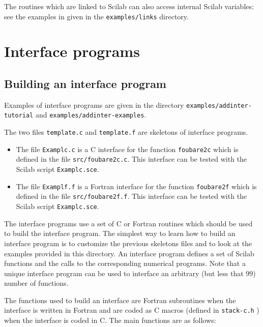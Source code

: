 The routines which are linked to Scilab can also access internal 
Scilab variables: see the examples in given in the {\tt examples/links}
directory.

\section{Interface programs}

\subsection{Building an interface program}
Examples of interface programs are given in the directory 
{\tt examples/addinter-tutorial} and {\tt examples/addinter-examples}. 

\noindent
The two files {\tt template.c} and {\tt template.f} are skeletons of 
interface programs.
\begin{itemize}
\item The file {\tt Examplc.c} is a C interface for the function {\tt foubare2c} 
which is defined in the file {\tt src/foubare2c.c}. This interface can
be tested with the Scilab script {\tt Examplc.sce}.
\item The file {\tt Examplf.f} is a Fortran interface for the function
{\tt foubare2f} which is defined in the file {\tt src/foubare2f.f}. 
This interface can be tested with the Scilab script {\tt Examplc.sce}.
\end{itemize}
The interface programs use a set of C or 
Fortran routines which should be used to build the interface program.
The simplest way to learn how to build an interface program is to
customize the previous skeletons files and to look at the examples
provided in this
directory. An interface program defines a set of Scilab functions
and the calls to the corresponding numerical programs.
Note that a unique interface program can be used to interface an 
arbitrary (but less that $99$) number of functions.


\noindent
The functions used to build an interface are Fortran subroutines when 
the interface is written in Fortran and are coded as C macros 
(defined in {\tt  stack-c.h} ) 
when the interface is coded in C. The main functions are as follows:

